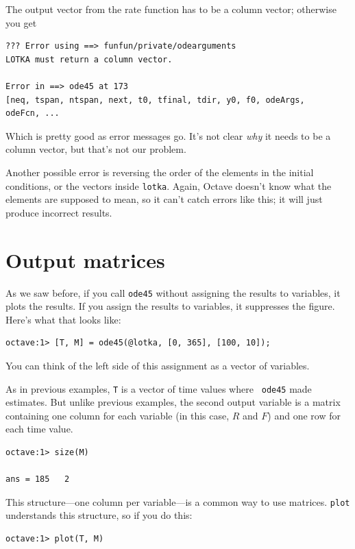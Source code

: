 \documentclass{book}
\begin{document}
The output vector from the rate function
has to be a column vector; otherwise you get

\begin{verbatim}
??? Error using ==> funfun/private/odearguments
LOTKA must return a column vector.

Error in ==> ode45 at 173
[neq, tspan, ntspan, next, t0, tfinal, tdir, y0, f0, odeArgs,
odeFcn, ...
\end{verbatim}

Which is pretty good as error messages go. It's not clear {\em why}
it needs to be a column vector, but that's not our problem.

Another possible error is reversing the order of the elements in the
initial conditions, or the vectors inside {\tt lotka}. Again, Octave
doesn't know what the elements are supposed to mean, so it can't catch
errors like this; it will just produce incorrect results.


\section{Output matrices}

As we saw before, if you call {\tt ode45} without assigning the
results to variables, it plots the results. 
If you assign
the results to variables, it suppresses the figure.
Here's what that looks like:

\begin{verbatim}
octave:1> [T, M] = ode45(@lotka, [0, 365], [100, 10]);
\end{verbatim}

You can think of the left side of this assignment as a vector
of variables.

As in previous examples, {\tt T} is a vector of time values where {\tt
ode45} made estimates. But unlike previous examples, the
second output variable is a matrix containing one column for each
variable (in this case, $R$ and $F$) and one row for each time value.

\begin{verbatim}
octave:1> size(M)

ans = 185   2
\end{verbatim}

This structure---one column per variable---is a common way to
use matrices. {\tt plot} understands this structure, so if you
do this:

\begin{verbatim}
octave:1> plot(T, M)
\end{verbatim}
\end{document}
